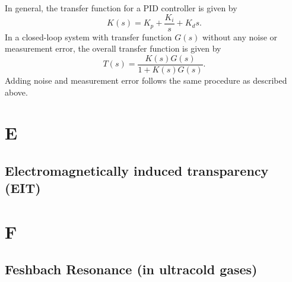 \documentclass{book}
\theoremstyle{definition}
\newcommand{\f}[2]{\frac{#1}{#2}}
\begin{document}
In general, the transfer function for a PID controller is given by 
\begin{equation*}
K(s) = K_p + \f{K_i}{s} + K_d s.
\end{equation*}
In a closed-loop system with transfer function $G(s)$ without any noise or measurement error, the overall transfer function is given by 
\begin{equation*}
T(s) = \f{K(s)G(s)}{1+ K(s)G(s)}. 
\end{equation*}
Adding noise and measurement error follows the same procedure as described above. 








\chapter*{E}



\section*{Electromagnetically induced transparency (EIT)}



\chapter*{F}


\section*{Feshbach Resonance (in ultracold gases)}
\end{document}
